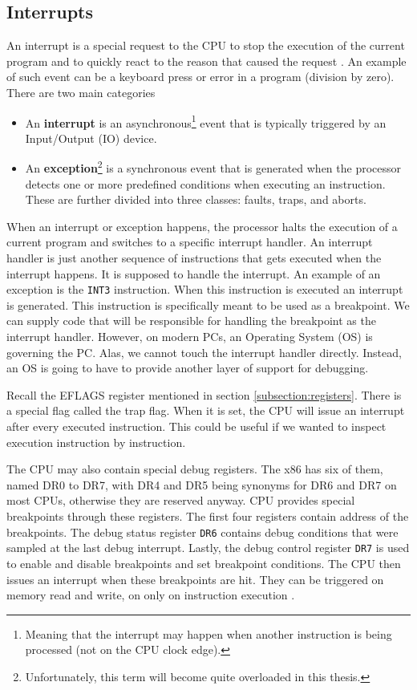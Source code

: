 \subsection{Interrupts}
An interrupt is a special request to the CPU to stop the execution of the
current program and to quickly react to the reason that caused the request
\cite{aps-interrupts}. An example of such event can be a keyboard press or
error in a program (division by zero). There are two main categories
\cite{intel-manual}
\begin{itemize}
    \item An \textbf{interrupt} is an asynchronous\footnote{Meaning that the
        interrupt may happen when another instruction is being processed (not
        on the CPU clock edge).} event that is typically triggered by an
        Input/Output (IO) device.
    \item An \textbf{exception}\footnote{Unfortunately, this term will become
        quite overloaded in this thesis.} is a synchronous event that is
        generated when the processor detects one or more predefined conditions
        when executing an instruction. These are further divided into three
        classes: faults, traps, and aborts.
\end{itemize}

When an interrupt or exception happens, the processor halts the execution of a
current program and switches to a specific interrupt handler. An interrupt
handler is just another sequence of instructions that gets executed when the
interrupt happens. It is supposed to handle the interrupt. An example of an
exception is the \texttt{INT3} instruction. When this instruction is executed
an interrupt is generated. This instruction is specifically meant to be used as
a breakpoint. We can supply code that will be responsible for handling the
breakpoint as the interrupt handler. However, on modern PCs, an Operating
System (OS) is governing the PC. Alas, we cannot touch the interrupt handler
directly. Instead, an OS is going to have to provide another layer of support
for debugging.

Recall the EFLAGS register mentioned in section \ref{subsection:registers}.
There is a special flag called the trap flag. When it is set, the CPU will
issue an interrupt after every executed instruction. This could be useful if we
wanted to inspect execution instruction by instruction.

The CPU may also contain special debug registers. The x86 has six of them,
named DR0 to DR7, with DR4 and DR5 being synonyms for DR6 and DR7 on most CPUs,
otherwise they are reserved anyway. CPU provides special breakpoints through
these registers. The first four registers contain address of the breakpoints.
The debug status register \texttt{DR6} contains debug conditions that were
sampled at the last debug interrupt. Lastly, the debug control register
\texttt{DR7} is used to enable and disable breakpoints and set breakpoint
conditions. The CPU then issues an interrupt when these breakpoints are hit.
They can be triggered on memory read and write, on only on instruction
execution \cite{intel-manual}.

